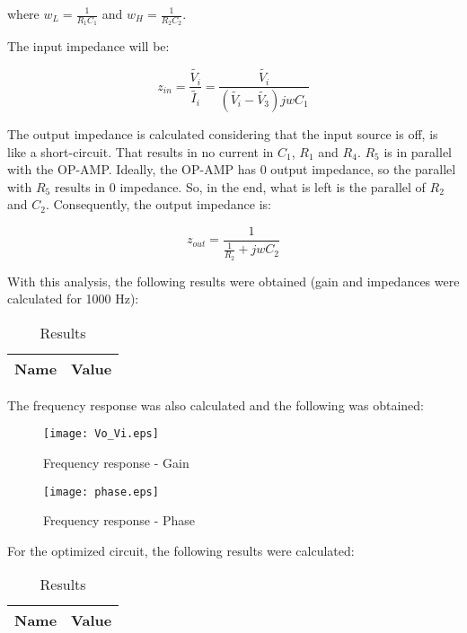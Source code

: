 where $w_L=\frac{1}{R_1C_1}$ and $w_H=\frac{1}{R_2C_2}$.

The input impedance will be: 

\begin{equation}
        z_{in} = \frac{\widetilde{V_i}}{\widetilde{I_i}} = \frac{\widetilde{V_i}}{(\widetilde{V_i}-\widetilde{V_3})jwC_1}
\end{equation}

The output impedance is calculated considering that the input source is off, is like a short-circuit. That results in no current in $C_1$, $R_1$ and $R_4$. $R_5$ is in parallel with the OP-AMP. Ideally, the OP-AMP has 0 output impedance, so the parallel with $R_5$ results in 0 impedance. So, in the end, what is left is the parallel of $R_2$ and $C_2$. Consequently, the output impedance is:

\begin{equation}
        z_{out} = \frac{1}{\frac{1}{R_2}+jwC_2}
\end{equation}

With this analysis, the following results were obtained (gain and impedances were calculated for 1000 Hz):

\begin{table}[H]
  \centering
  \begin{tabular}{|c|c|}
    \hline
        {\bf Name} & {\bf Value} \\
        \hline
        \hline
        
        \hline
  \end{tabular}
  \caption{Results}
  \label{teo_results}
\end{table}

The frequency response was also calculated and the following was obtained:

\begin{figure}[H]
        \centering
        \texttt{[image: Vo\_Vi.eps]}
        \caption{Frequency response - Gain}
        \label{tfrg}
\end{figure}

\begin{figure}[H]
        \centering
        \texttt{[image: phase.eps]}
        \caption{Frequency response - Phase}
        \label{tfrf}
\end{figure}


For the optimized circuit, the following results were calculated:

\begin{table}[H]
  \centering
  \begin{tabular}{|c|c|}
    \hline
        {\bf Name} & {\bf Value} \\
        \hline
        \hline
        
        \hline
  \end{tabular}
  \caption{Results}
  \label{teo_results}
\end{table}

